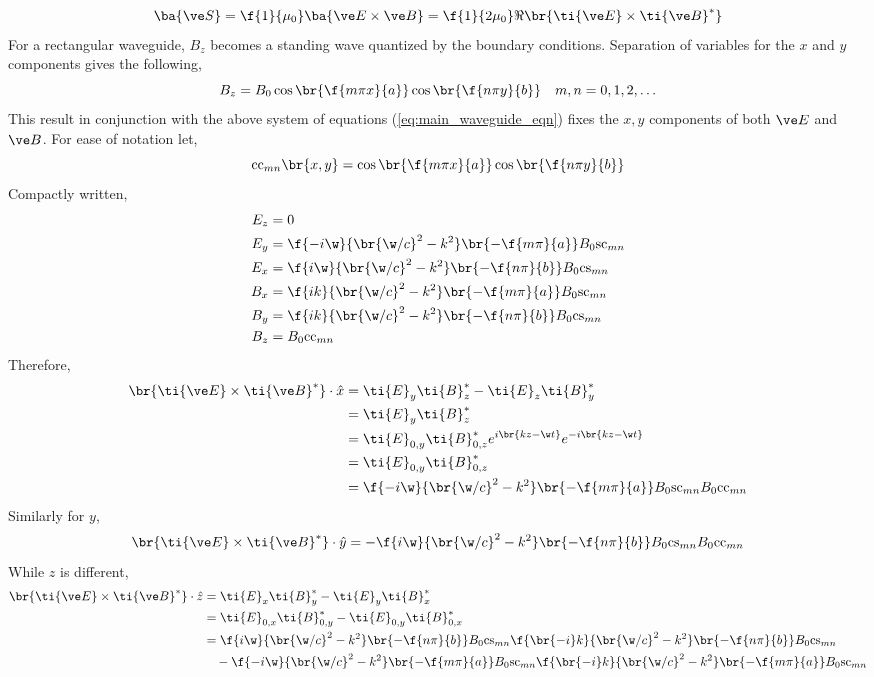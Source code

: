 \documentclass{article}
\begin{document}
\[ \ba{\ve S} = \f{1}{\mu_0} \ba{\ve E \times \ve B} = \f{1}{2 \mu_0} \Re\br{\ti{\ve E} \times \ti{\ve B}^*} \]
For a rectangular waveguide, $B_z$ becomes a standing wave quantized by the boundary conditions. Separation of variables for the $x$ and $y$ components gives the following,
\[ B_z = B_0 \cos \br{\f{m \pi x}{a}} \cos \br{\f{n \pi y}{b}} \quad m, n = 0, 1, 2,\ldots \]
This result in conjunction with the above system of equations (\cref{eq:main_waveguide_eqn}) fixes the $x,y$ components of both $\ve E$ and $\ve B$. For ease of notation let,
\[ \text{cc}_{mn}\br{x,y} = \cos \br{\f{m \pi x}{a}} \cos \br{\f{n \pi y}{b}} \]
Compactly written,
\begin{align*}
    E_z &= 0 \\
    E_y &= \f{-i \w}{\br{\w / c}^2 - k^2} \br{- \f{m \pi}{a}} B_0 \text{sc}_{mn} \\
    E_x &= \f{i \w}{\br{\w / c}^2 - k^2} \br{- \f{n \pi}{b}} B_0 \text{cs}_{mn} \\
    B_x &= \f{i k}{\br{\w / c}^2 - k^2} \br{- \f{m \pi}{a}} B_0 \text{sc}_{mn} \\
    B_y &= \f{i k}{\br{\w / c}^2 - k^2} \br{- \f{n \pi}{b}} B_0 \text{cs}_{mn} \\
    B_z &= B_0 \text{cc}_{mn}
\end{align*}
Therefore,
\begin{align*}
\br{\ti{\ve E} \times \ti{\ve B}^*} \cdot \hat x
&= \ti{E}_y\ti{B}_z^* - \ti{E}_z\ti{B}_y^* \\
&= \ti{E}_y\ti{B}_z^* \\
&= \ti{E}_{0, y}\ti{B}_{0, z}^* e^{i \br{k z - \w t}}e^{-i \br{k z - \w t}} \\
&= \ti{E}_{0, y}\ti{B}_{0, z}^* \\
&= \f{-i \w}{\br{\w / c}^2 - k^2} \br{- \f{m \pi}{a}} B_0 \text{sc}_{mn} B_0 \text{cc}_{mn}
\end{align*}
Similarly for $y$,
\[ \br{\ti{\ve E} \times \ti{\ve B}^*} \cdot \hat y = - \f{i \w}{\br{\w / c}^2 - k^2} \br{- \f{n \pi}{b}} B_0 \text{cs}_{mn} B_0 \text{cc}_{mn}\]
While $z$ is different,
\begin{align*}
\br{\ti{\ve E} \times \ti{\ve B}^*} \cdot \hat z
&= \ti{E}_x\ti{B}_y^* - \ti{E}_y\ti{B}_x^* \\
&= \ti{E}_{0,x}\ti{B}_{0,y}^* - \ti{E}_{0,y}\ti{B}_{0,x}^* \\
&= \f{i \w}{\br{\w / c}^2 - k^2} \br{- \f{n \pi}{b}} B_0 \text{cs}_{mn} \f{\br{-i} k}{\br{\w / c}^2 - k^2} \br{- \f{n \pi}{b}} B_0 \text{cs}_{mn} \\ &\quad- \f{-i \w}{\br{\w / c}^2 - k^2} \br{- \f{m \pi}{a}} B_0 \text{sc}_{mn} \f{\br{-i} k}{\br{\w / c}^2 - k^2} \br{- \f{m \pi}{a}} B_0 \text{sc}_{mn}
\end{align*}
\end{document}
